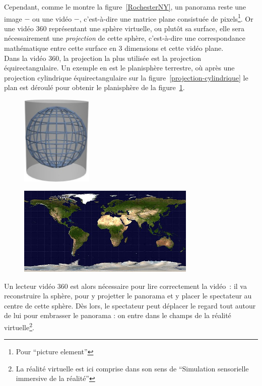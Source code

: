 \newline
Cependant, comme le montre la figure~\ref{RochesterNY}, un panorama reste une image
$-$ ou une vidéo $-$, c'est-à-dire une matrice plane consistuée de pixels\footnote{Pour
 \enquote{picture element}}. Or une vidéo 360 représentant une sphère virtuelle, ou
plutôt sa surface, elle sera nécessairement une \emph{projection} de cette sphère, 
c'est-à-dire une correspondance mathématique entre cette surface en 3 dimensions 
et cette vidéo plane\cite{projection-cartographique}.\\
Dans la vidéo 360, la projection la plus utilisée est la projection équirectangulaire\cite{what-is-equirectangular}.
Un exemple en est le planisphère terrestre, où après une projection cylindrique équirectangulaire
sur la figure~\ref{projection-cylindrique} le plan est déroulé pour obtenir le 
planisphère de la figure~\ref{planisphère}.
\begin{figure}
  \centering
  \begin{minipage}[t]{0.35\textwidth}
    \centering
    \includegraphics[width=3.4cm]{images/Projection-cylindrique.jpg}
    \label{projection-cylindrique}
  \end{minipage}%
  \hspace{0.04\textwidth}
  \begin{minipage}[t]{0.6\textwidth}
    \centering
    \includegraphics[width=8.5cm]{images/Equirectangular-projection.jpg}
    \label{planisphère}
  \end{minipage}
\end{figure}
\newline
Un lecteur vidéo 360 est alors nécessaire pour lire correctement la vidéo~: 
il va reconstruire la sphère, pour y projetter le panorama et y placer le
spectateur au centre de cette sphère. Dès lors, le spectateur peut déplacer le 
regard tout autour de lui pour embrasser le panorama : on entre dans le champs de 
la réalité virtuelle\footnote{La réalité virtuelle est ici comprise dans son sens
  de \enquote{Simulation sensorielle immersive de la réalité}\cite{definition-rv}}.

